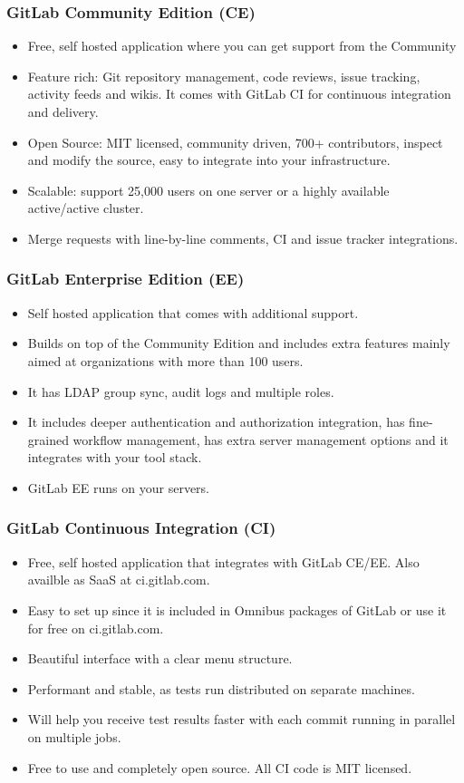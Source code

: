 \subsubsection{GitLab Community Edition (CE)}
\begin{itemize}
	\item Free, self hosted application where you can get support from the Community
	\item Feature rich: Git repository management, code reviews, issue tracking, activity feeds and wikis. It comes with GitLab CI for continuous integration and delivery.
	\item Open Source: MIT licensed, community driven, 700+ contributors, inspect and modify the source, easy to integrate into your infrastructure.
	\item Scalable: support 25,000 users on one server or a highly available active/active cluster.
	\item Merge requests with line-by-line comments, CI and issue tracker integrations.
\end{itemize}

\subsubsection{GitLab Enterprise Edition (EE)}
\begin{itemize}
	\item Self hosted application that comes with additional support.
	\item Builds on top of the Community Edition and includes extra features mainly aimed at organizations with more than 100 users.
	\item It has LDAP group sync, audit logs and multiple roles.
	\item It includes deeper authentication and authorization integration, has fine-grained workflow management, has extra server management options and it integrates with your tool stack.
	\item GitLab EE runs on your servers.
\end{itemize}

\subsubsection{GitLab Continuous Integration (CI)}
\begin{itemize}
	\item Free, self hosted application that integrates with GitLab CE/EE. Also availble as SaaS at ci.gitlab.com.
	\item Easy to set up since it is included in Omnibus packages of GitLab or use it for free on ci.gitlab.com.
	\item Beautiful interface with a clear menu structure.
	\item Performant and stable, as tests run distributed on separate machines.
	\item Will help you receive test results faster with each commit running in parallel on multiple jobs.
	\item Free to use and completely open source. All CI code is MIT licensed.
\end{itemize}



